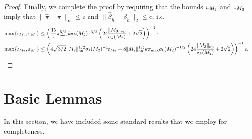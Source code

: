 \begin{proof}
Finally, we complete the proof by requiring that the bounds $\varepsilon_{M_2}$ and
$\varepsilon_{M_3}$ imply that $\|\hat \pi - \pi \|_{\infty} \le \epsilon$ and
$\|\hat \beta_h - \beta_h\|_2 \le \epsilon$, i.e.
\begin{align*}
  \max\{\varepsilon_{M_2}, \varepsilon_{M_3}\} &\le
  \left( \frac{15}{2} \pi_{\max}^{5/2} k 
  \sigma_k(M_2)^{-3/2}
  \left(24 \frac{\| {M_3} \|_{\text{\rm op}}}{\sigma_k(M_2)} + 2\sqrt{2} \right) \right)^{-1} \epsilon \\
  \max\{\varepsilon_{M_2}, \varepsilon_{M_3}\} &\le
  \left( 4\sqrt{3/2} \|M_2\|_{\text{\rm op}}^{1/2} \sigma_k(M_2)^{-1} \varepsilon_{M_2}
    + 8 \|M_2\|_{\text{\rm op}}^{1/2} k \pi_{\max} 
      \sigma_k(M_2)^{-3/2}
        \left(24 \frac{\| {M_3} \|_{\text{\rm op}}}{\sigma_k(M_2)} + 2\sqrt{2} \right)
        \right)^{-1} \epsilon.
\end{align*}

\end{proof}

\section{Basic Lemmas}

In this section, we have included some standard results that we employ for completeness.

